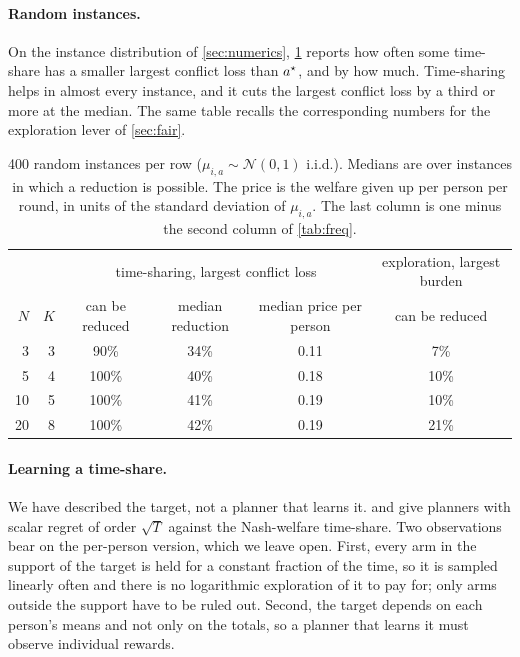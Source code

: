 \paragraph{Random instances.} On the instance distribution of \cref{sec:numerics}, \cref{tab:share} reports how often some time-share has a smaller largest conflict loss than $a^\star$, and by how much. Time-sharing helps in almost every instance, and it cuts the largest conflict loss by a third or more at the median. The same table recalls the corresponding numbers for the exploration lever of \cref{sec:fair}.

\begin{table}[h]\centering\small
\begin{tabular}{rrccc|c}
\toprule
& & \multicolumn{3}{c|}{time-sharing, largest conflict loss} & exploration, largest burden\\
$N$ & $K$ & can be reduced & median reduction & median price per person & can be reduced\\
\midrule
3 & 3 & 90\% & 34\% & 0.11 & 7\%\\
5 & 4 & 100\% & 40\% & 0.18 & 10\%\\
10 & 5 & 100\% & 41\% & 0.19 & 10\%\\
20 & 8 & 100\% & 42\% & 0.19 & 21\%\\
\bottomrule
\end{tabular}
\caption{400 random instances per row ($\mu_{i,a}\sim\mathcal N(0,1)$ i.i.d.). Medians are over instances in which a reduction is possible. The price is the welfare given up per person per round, in units of the standard deviation of $\mu_{i,a}$. The last column is one minus the second column of \cref{tab:freq}.}
\label{tab:share}
\end{table}

\paragraph{Learning a time-share.} We have described the target, not a planner that learns it. \citet{hossain2021} and \citet{jones2023} give planners with scalar regret of order $\sqrt T$ against the Nash-welfare time-share. Two observations bear on the per-person version, which we leave open. First, every arm in the support of the target is held for a constant fraction of the time, so it is sampled linearly often and there is no logarithmic exploration of it to pay for; only arms outside the support have to be ruled out. Second, the target depends on each person's means and not only on the totals, so a planner that learns it must observe individual rewards.
